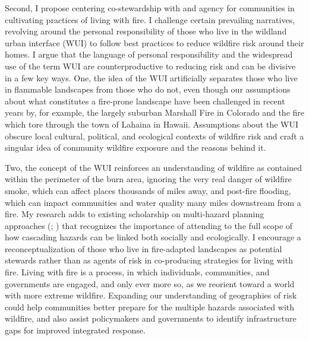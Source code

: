 \documentclass[
]{article}
\begin{document}
Second, I propose centering co-stewardship with and agency for communities in cultivating practices of living with fire. I challenge certain prevailing narratives, revolving around the personal responsibility of those who live in the wildland urban interface (WUI) to follow best practices to reduce wildfire risk around their homes. I argue that the language of personal responsibility and the widespread use of the term WUI are counterproductive to reducing risk and can be divisive in a few key ways. One, the idea of the WUI artificially separates those who live in flammable landscapes from those who do not, even though our assumptions about what constitutes a fire-prone landscape have been challenged in recent years by, for example, the largely suburban Marshall Fire in Colorado and the fire which tore through the town of Lahaina in Hawaii. Assumptions about the WUI obscure local cultural, political, and ecological contexts of wildfire risk and craft a singular idea of community wildfire exposure and the reasons behind it.

Two, the concept of the WUI reinforces an understanding of wildfire as contained within the perimeter of the burn area, ignoring the very real danger of wildfire smoke, which can affect places thousands of miles away, and post-fire flooding, which can impact communities and water quality many miles downstream from a fire. My research adds to existing scholarship on multi-hazard planning approaches (; ) that recognizes the importance of attending to the full scope of how cascading hazards can be linked both socially and ecologically. I encourage a reconceptualization of those who live in fire-adapted landscapes as potential stewards rather than as agents of risk in co-producing strategies for living with fire. Living with fire is a process, in which individuals, communities, and governments are engaged, and only ever more so, as we reorient toward a world with more extreme wildfire. Expanding our understanding of geographies of risk could help communities better prepare for the multiple hazards associated with wildfire, and also assist policymakers and governments to identify infrastructure gaps for improved integrated response.
\end{document}
